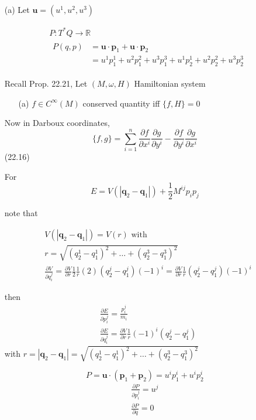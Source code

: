 \begin{enumerate}
\item[(a)] Let $\mathbf{u} = (u^1,u^2,u^3)$ 

\[
\begin{aligned}
  & P : T^*Q \to \mathbb{R} \\ 
  & \begin{aligned} P(q,p) & = \mathbf{u}\cdot \mathbf{p}_1 + \mathbf{u}\cdot \mathbf{p}_2 \\ 
      & = u^1p_1^1 + u^2p_1^2 + u^3 p_1^3 +u^1p_2^1 + u^2 p_2^2 + u^3 p_2^3 \end{aligned}
\end{aligned}
\]

 Recall Prop. 22.21, Let $(M,\omega, H)$ Hamiltonian system
\begin{enumerate}
\item[(a)] $f \in C^{\infty}(M)$ conserved quantity iff $\lbrace f, H\rbrace =0$
\end{enumerate}

Now in Darboux coordinates,
\[
\lbrace f, g \rbrace = \sum_{i=1}^n \frac{ \partial f}{ \partial x^i} \frac{ \partial g}{ \partial y^i } - \frac{ \partial f}{ \partial y^i } \frac{ \partial g}{ \partial x^i}
\]
(22.16)

For 
\[
E = V(|\mathbf{q}_2 - \mathbf{q}_1|) + \frac{1}{2} M^{ij}p_ip_j
\]

note that 

\[
\begin{aligned}
  & V(| \mathbf{q}_2 - \mathbf{q}_1|) = V(r) \text{ with } \\ 
  & r = \sqrt{ (q_2^1 - q_1^1)^2 + \dots + (q_2^3 - q_1^3)^2 } \\ 
  & \frac{ \partial V}{ \partial q_i^j} = \frac{ \partial V}{ \partial r} \frac{1}{2} \frac{1}{r}(2)(q_2^j - q_1^j)(-1)^i = \frac{ \partial V}{ \partial r} \frac{1}{r} (q_2^j-q_1^j)(-1)^i
\end{aligned}
\]



then
\[
\begin{aligned}
  & \frac{ \partial E}{ \partial p_i^j} = \frac{p_i^j}{m_i} \\ 
  & \frac{ \partial E}{ \partial q_i^j} = \frac{ \partial V}{ \partial r} \frac{1}{r}(-1)^i (q_2^j-q_1^j)
\end{aligned}
\]
with $r = |\mathbf{q}_2 - \mathbf{q}_1| = \sqrt{ (q_2^1- q_1^1)^2 + \dots + (q_2^3- q_1^3)^2 }$

\[
P = \mathbf{u}\cdot (\mathbf{p}_1 + \mathbf{p}_2) = u^i p^i_1 + u^i p_2^i
\]
\[
\begin{aligned}
\frac{ \partial P}{ \partial p_i^j} = u^j  \\ 
 \frac{ \partial P}{ \partial q }=  0
\end{aligned}
\]


\end{enumerate}
